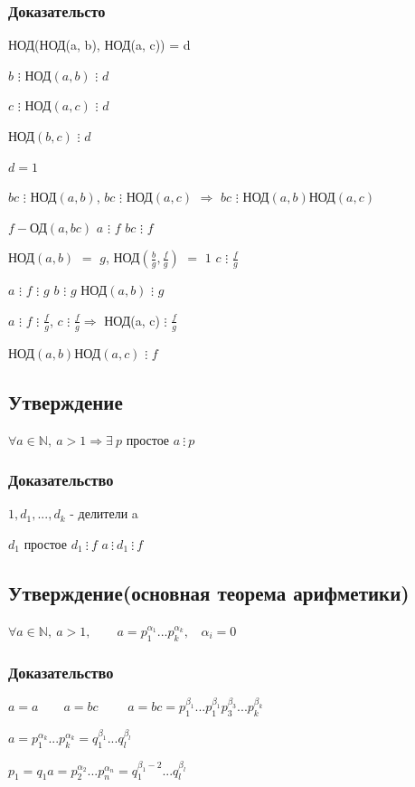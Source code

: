 \documentclass[12pt]{article}
\begin{document}
            \subsubsection{Доказательсто}
            НОД(НОД(a, b), НОД(a, c)) = d \par
        $b$ $\vdots$ НОД$(a, b)$ $\vdots$ $d$ \par
        $c$ $\vdots$ НОД$(a, c)$ $\vdots$ $d$ \par
            НОД$(b, c)$ $\vdots$ $d$ \par
        $d = 1$\par
        $bc$ $\vdots$ НОД$(a, b)$, $bc$ $\vdots$ НОД$(a, c)$ $\Rightarrow$ $bc$ $\vdots$ НОД$(a, b)$НОД$(a, c)$ \par
        $f-$ОД$(a, bc)$ \qquad
        $a$ $\vdots$ $f$ \qquad
        $bc$ $\vdots$ $f$ \par
            НОД$(a, b)$ $=$ $g$, НОД$(\frac{b}{g}, \frac{f}{g})$ $=$ $1$ \qquad $c$ $\vdots$ $\frac{f}{g}$\par
        $a$ $\vdots$ $f$ $\vdots$ $g$ \qquad $b$ $\vdots$ $g$ \qquad НОД$(a, b)$ $\vdots$ $g$\par
        $a$ $\vdots$ $f$ $\vdots$ $\frac{f}{g}$, $c$ $\vdots$ $\frac{f}{g}\Rightarrow$ НОД(a, c) $\vdots$ $\frac{f}{g}$\par
            НОД$(a, b)$НОД$(a, c)$ $\vdots$ $f$
            \subsection{Утверждение}
        $\forall a \in \mathbb{N},\ a > 1 \Rightarrow \exists \ p$ простое $a\ \vdots \ p$
            \subsubsection{Доказательство}
        $1,d_1,..., d_k$ - делители a \par
        $d_1$ простое $d_1 \ \vdots \ f$ \qquad $a \ \vdots \ d_1 \ \vdots \ f$ \par
            \subsection{Утверждение(основная теорема арифметики)}
        $\forall a \in \mathbb{N}, \ a>1, \qquad a = p_1^{\alpha_1} ... p_k^{\alpha_k}, \ \ \ \ \alpha_i = 0$
            \subsubsection{Доказательство}
        $a = a \qquad a=bc \qquad$ $a=bc=p_1^{\beta_1}...p_1^{\beta_1}p_3^{\beta_3}...p_k^{\beta_k}$ \par $a=p_1^{\alpha_k}...p_k^{\alpha_k} = q_1^{\beta_1}...q_l^{\beta_l}$ \par
        $p_1 = q_1a=p_2^{\alpha_2}...p_n^{\alpha_n}=q_1^{\beta_1-2}...q_l^{\beta_l}$
\end{document}
